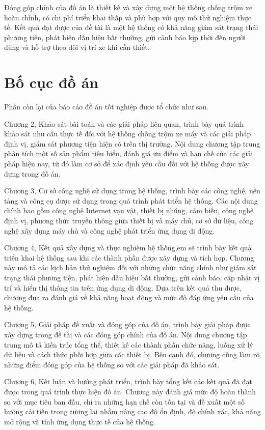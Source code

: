 \documentclass[../DoAn.tex]{subfiles}
\begin{document}
Đóng góp chính của đồ án là thiết kế và xây dựng một hệ thống chống trộm xe hoàn chỉnh, có chi phí triển khai thấp và phù hợp với quy mô thử nghiệm thực tế. Kết quả đạt được của đề tài là một hệ thống có khả năng giám sát trạng thái phương tiện, phát hiện dấu hiệu bất thường, gửi cảnh báo kịp thời đến người dùng và hỗ trợ theo dõi vị trí xe khi cần thiết.


\section{Bố cục đồ án}
\label{section:1.4}
Phần còn lại của báo cáo đồ án tốt nghiệp được tổ chức như sau.

Chương 2, Khảo sát bài toán và các giải pháp liên quan, trình bày quá trình khảo sát nhu cầu thực tế đối với hệ thống chống trộm xe máy và các giải pháp định vị, giám sát phương tiện hiện có trên thị trường. Nội dung chương tập trung phân tích một số sản phẩm tiêu biểu, đánh giá ưu điểm và hạn chế của các giải pháp hiện nay, từ đó làm cơ sở để xác định yêu cầu đối với hệ thống được xây dựng trong đồ án.

Chương 3, Cơ sở công nghệ sử dụng trong hệ thống, trình bày các công nghệ, nền tảng và công cụ được sử dụng trong quá trình phát triển hệ thống. Các nội dung chính bao gồm công nghệ Internet vạn vật, thiết bị nhúng, cảm biến, công nghệ định vị, phương thức truyền thông giữa thiết bị và máy chủ, cơ sở dữ liệu, công nghệ xây dựng máy chủ và công nghệ phát triển ứng dụng di động.

Chương 4, Kết quả xây dựng và thực nghiệm hệ thống,em sẽ trình bày kết quả triển khai hệ thống sau khi các thành phần được xây dựng và tích hợp. Chương này mô tả các kịch bản thử nghiệm đối với những chức năng chính như giám sát trạng thái phương tiện, phát hiện dấu hiệu bất thường, gửi cảnh báo, cập nhật vị trí và hiển thị thông tin trên ứng dụng di động. Dựa trên kết quả thu được, chương đưa ra đánh giá về khả năng hoạt động và mức độ đáp ứng yêu cầu của hệ thống.

Chương 5, Giải pháp đề xuất và đóng góp của đồ án, trình bày giải pháp được xây dựng trong đề tài và các đóng góp chính của đồ án. Nội dung chương tập trung mô tả kiến trúc tổng thể, thiết kế các thành phần chức năng, luồng xử lý dữ liệu và cách thức phối hợp giữa các thiết bị. Bên cạnh đó, chương cũng làm rõ những điểm đóng góp của hệ thống so với các giải pháp đã khảo sát.

Chương 6, Kết luận và hướng phát triển, trình bày tổng kết các kết quả đã đạt được trong quá trình thực hiện đồ án. Chương này đánh giá mức độ hoàn thành so với mục tiêu ban đầu, chỉ ra những hạn chế còn tồn tại và đề xuất một số hướng cải tiến trong tương lai nhằm nâng cao độ ổn định, độ chính xác, khả năng mở rộng và tính ứng dụng thực tế của hệ thống.
\end{document}
